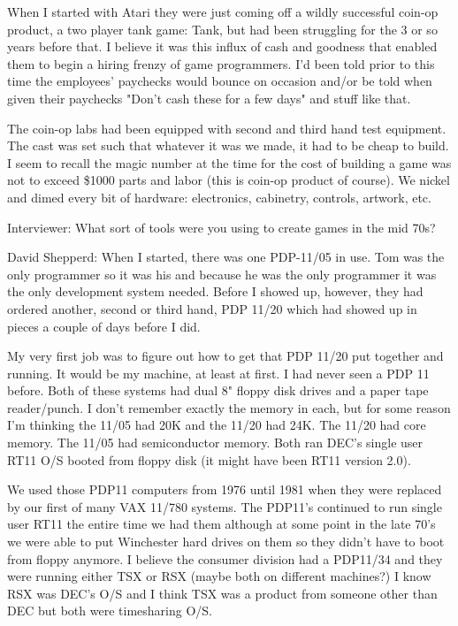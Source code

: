 When I started with Atari they were just coming off a wildly successful coin-op product, a two player tank game: Tank, but had been struggling for the 3 or so years before that. I believe it was this influx of cash and goodness that enabled them to begin a hiring frenzy of game programmers. I'd been told prior to this time the employees' paychecks would bounce on occasion and/or be told when given their paychecks "Don't cash these for a few days" and stuff like that. 

The coin-op labs had been equipped with second and third hand test equipment. The cast was set such that whatever it was we made, it had to be cheap to build. I seem to recall the magic number at the time for the cost of building a game was not to exceed \$1000 parts and labor (this is coin-op product of course). We nickel and dimed every bit of hardware: electronics, cabinetry, controls, artwork, etc. 

\textcolor{interviewer}{Interviewer:} What sort of tools were you using to create games in the mid 70s?

\textcolor{interviewee}{David Shepperd:} When I started, there was one PDP-11/05 in use. Tom was the only programmer so it was his and because he was the only programmer it was the only development system needed. Before I showed up, however, they had ordered another, second or third hand, PDP 11/20 which had showed up in pieces a couple of days before I did. 

My very first job was to figure out how to get that PDP 11/20 put together and running. It would be my machine, at least at first. I had never seen a PDP 11 before. Both of these systems had dual 8" floppy disk drives and a paper tape reader/punch. I don't remember exactly the memory in each, but for some reason I'm thinking the 11/05 had 20K and the 11/20 had 24K. The 11/20 had core memory. The 11/05 had semiconductor memory. Both ran DEC's single user RT11 O/S booted from floppy disk (it might have been RT11 version 2.0). 

We used those PDP11 computers from 1976 until 1981 when they were replaced by our first of many VAX 11/780 systems. The PDP11's continued to run single user RT11 the entire time we had them although at some point in the late 70's we were able to put Winchester hard drives on them so they didn't have to boot from floppy anymore. I believe the consumer division had a PDP11/34 and they were running either TSX or RSX (maybe both on different machines?) I know RSX was DEC's O/S and I think TSX was a product from someone other than DEC but both were timesharing O/S.


